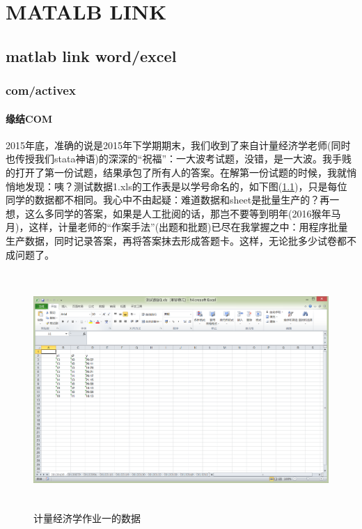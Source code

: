 % 
\chapter{MATALB LINK}
\section{matlab link word/excel}
    \subsection{com/activex}
        \subsubsection{缘结COM}
            \par
            2015年底，准确的说是2015年下学期期末，我们收到了来自计量经济学老师(同时也传授我们stata神语)的深深的“祝福”：一大波考试题，没错，是一大波。我手贱的打开了第一份试题，结果承包了所有人的答案。在解第一份试题的时候，我就悄悄地发现：咦？测试数据1.xls的工作表是以学号命名的，如下图(\ref{fig:Link_1})，只是每位同学的数据都不相同。我心中不由起疑：难道数据和sheet是批量生产的？再一想，这么多同学的答案，如果是人工批阅的话，那岂不要等到明年(2016猴年马月)，这样，计量老师的“作案手法”(出题和批题)已尽在我掌握之中：用程序批量生产数据，同时记录答案，再将答案抹去形成答题卡。这样，无论批多少试卷都不成问题了。
            \begin{figure}[H]
            \centering
            \includegraphics[height=9cm]{images/Link_1.jpg}
            \caption{计量经济学作业一的数据}
            \label{fig:Link_1}
            \end{figure}
